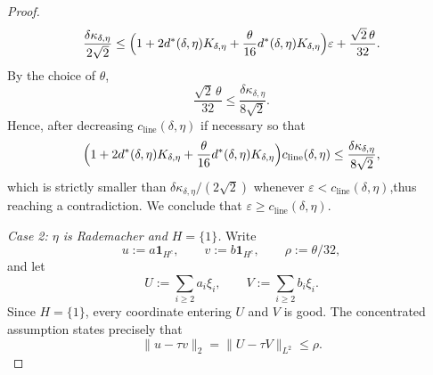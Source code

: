 \documentclass[11pt]{amsart}
\numberwithin{equation}{section}
\theoremstyle{definition}
\theoremstyle{remark}
\newcommand{\eps}{\varepsilon}
\newcommand{\norm}[1]{\lVert #1 \rVert}
\begin{document}
\begin{proof}
	\[
	\frac{\delta\kappa_{\delta,\eta}}{2\sqrt2}
	\le
	\Bigl(1+2d^*(\delta,\eta)K_{\delta,\eta}
	+\frac{\theta}{16}d^*(\delta,\eta)K_{\delta,\eta}\Bigr)\eps
	+\frac{\sqrt2\,\theta}{32}.
	\]
	By the choice of $\theta$,
	\[
	\frac{\sqrt2\,\theta}{32}
	\le \frac{\delta\kappa_{\delta,\eta}}{8\sqrt2}.
	\]
	Hence, after decreasing $c_{\mathrm{line}}(\delta,\eta)$ if necessary so that
	\[
	\Bigl(1+2d^*(\delta,\eta)K_{\delta,\eta}
	+\frac{\theta}{16}d^*(\delta,\eta)K_{\delta,\eta}\Bigr)
	c_{\mathrm{line}}(\delta,\eta)
	\le \frac{\delta\kappa_{\delta,\eta}}{8\sqrt2},
	\]
	which is strictly smaller than
$\delta\kappa_{\delta,\eta}/(2\sqrt2)$ whenever
	$\eps<c_{\mathrm{line}}(\delta,\eta)$,thus reaching a contradiction. We conclude that
	$\eps\ge c_{\mathrm{line}}(\delta,\eta)$.

\smallskip
\noindent\emph{Case 2: $\eta$ is Rademacher and $H=\{1\}$.}
Write
\[
u:=a\mathbf 1_{H^c},
\qquad
v:=b\mathbf 1_{H^c},
\qquad
\rho:=\theta/32,
\]
and let
\[
U:=\sum_{i\ge2} a_i\xi_i,
\qquad
V:=\sum_{i\ge2} b_i\xi_i.
\]
Since $H=\{1\}$, every coordinate entering $U$ and $V$ is good.  The
concentrated assumption states precisely that
\[
\norm{u-\tau v}_2=\norm{U-\tau V}_{L^2}\le \rho.
\]


\end{proof}
\end{document}
